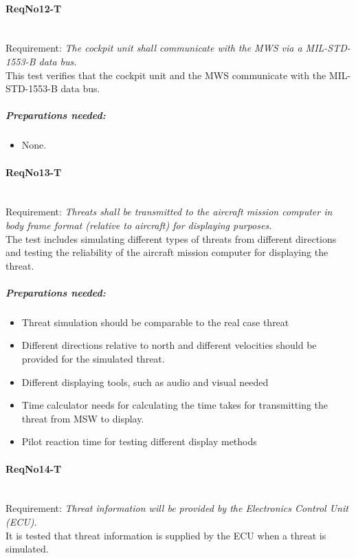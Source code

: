 \paragraph{ReqNo12-T}\mbox{}\\ %
Requirement: \textit{The cockpit unit shall communicate with the MWS via a MIL-STD-1553-B data bus.}\\
This test verifies that the cockpit unit and the MWS communicate with the MIL-STD-1553-B data bus.
	\subparagraph{Preparations needed:}
	\begin{itemize}
	\item None.
	\end{itemize}

\paragraph{ReqNo13-T}\mbox{}\\ %
Requirement: \textit{Threats shall be transmitted to the aircraft mission computer in body frame format (relative to aircraft) for displaying purposes.}\\
The test includes simulating different types of threats from different directions and testing the reliability of the aircraft mission computer for displaying the threat.
	\subparagraph{Preparations needed:}
	\begin{itemize}
	\item Threat simulation should be comparable to the real case threat
	\item Different directions relative to north and different velocities should be provided for the simulated threat.
	\item Different displaying tools, such as audio and visual needed
	\item Time calculator needs for calculating the time takes for transmitting the threat from MSW to display.
	\item Pilot reaction time for testing different display methods
	\end{itemize}

\paragraph{ReqNo14-T}\mbox{}\\ %
Requirement: \textit{Threat information will be provided by the Electronics Control Unit (ECU).}
\\
It is tested that threat information is supplied by the ECU when a threat is simulated.

